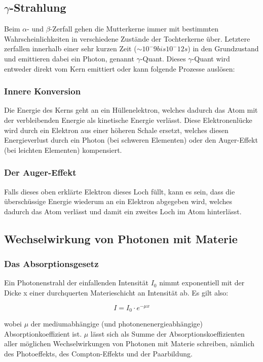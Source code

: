 \subsection{$\gamma$-Strahlung}

Beim $\alpha$- und $\beta$-Zerfall gehen die Mutterkerne immer mit bestimmten Wahrscheinlichkeiten in verschiedene Zustände der Tochterkerne über. Letztere zerfallen innerhalb einer sehr kurzen Zeit ($\sim 10^-9 bis 10^-12 s$) in den Grundzustand und emittieren dabei ein Photon, genannt $\gamma$-Quant. Dieses $\gamma$-Quant wird entweder direkt vom Kern emittiert oder kann folgende Prozesse auslösen:

\subsubsection{Innere Konversion}

Die Energie des Kerns geht an ein Hüllenelektron, welches dadurch das Atom mit der verbleibenden Energie als kinetische Energie verlässt. Diese Elektronenlücke wird durch ein Elektron aus einer höheren Schale ersetzt, welches diesen Energieverlust durch ein Photon (bei schweren Elementen) oder den Auger-Effekt (bei leichten Elementen) kompensiert.

\subsubsection{Der Auger-Effekt}

Falls dieses oben erklärte Elektron dieses Loch füllt, kann es sein, dass die überschüssige Energie wiederum an ein Elektron abgegeben wird, welches dadurch das Atom verlässt und damit ein zweites Loch im Atom hinterlässt.


\subsection{Wechselwirkung von Photonen mit Materie}

\subsubsection{Das Absorptionsgesetz}

Ein Photonenstrahl der einfallenden Intensität $I_0$ nimmt exponentiell mit der Dicke x einer durchquerten Materieschicht an Intensität ab. Es gilt also:

$$ I = I_0\cdot e^{-\mu x} $$

wobei $\mu$ der mediumabhängige (und photonenenergieabhängige) Absorptionkoeffizient ist. $\mu$ lässt sich als Summe der Absorptionskoeffizienten aller möglichen Wechselwirkungen von Photonen mit Materie schreiben, nämlich des Photoeffekts, des Compton-Effekts und der Paarbildung.

